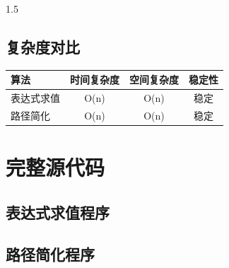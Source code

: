 \documentclass[a4paper,12pt]{report}
\begin{document}
\begin{spacing}{1.5}
\section{复杂度对比}
\begin{table}[H]
    \centering
    \begin{tabular}{|l|c|c|c|}
        \hline
        \textbf{算法} & \textbf{时间复杂度} & \textbf{空间复杂度} & \textbf{稳定性} \\
        \hline
        表达式求值 & O(n) & O(n) & 稳定 \\
        路径简化 & O(n) & O(n) & 稳定 \\
        \hline
    \end{tabular}
\end{table}

\end{spacing}

\appendix
\chapter{完整源代码}

\section{表达式求值程序}


\section{路径简化程序}

\end{document}
